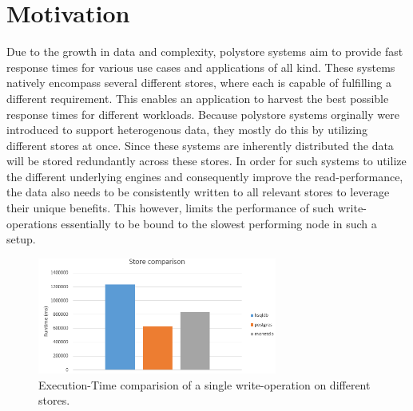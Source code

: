 
\section{Motivation}

Due to the growth in data and complexity, polystore systems aim to provide fast response times for various use cases and applications of all kind.
These systems natively encompass several different stores, where each is capable of fulfilling a different requirement. 
This enables an application to harvest the best possible response times for different workloads.
Because polystore systems orginally were introduced to support heterogenous data, they mostly do this by utilizing different stores at once.
Since these systems are inherently distributed the data will be stored redundantly across these stores. 
In order for such systems to utilize the different underlying engines and consequently improve the read-performance, 
the data also needs to be consistently written to all relevant stores to leverage their unique benefits.
This however, limits the performance of such write-operations essentially to be bound to the slowest performing node in such a setup.

\begin{figure}[t] 
    \centering 
    \includegraphics[width=0.7\textwidth]{Figures/stores.png}
    \caption{Execution-Time comparision of a single write-operation on different stores.}
    \label{fig:stores}
\end{figure}
 
